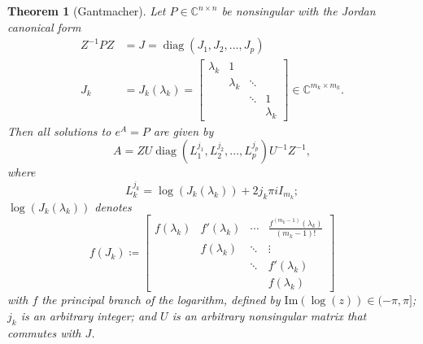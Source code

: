 \documentclass[letterpaper,10pt,journal,final]{IEEEtran}
\newtheorem{theorem}{Theorem}
\theoremstyle{definition}
\theoremstyle{remark}
\newcommand{\diag}{\operatorname{diag}}
\begin{document}
\begin{theorem}[Gantmacher{\protect\cite[Thm.~1.27]{Higham2008}}]
  \label{thm:matr-logar-Gantmacher}
  Let $P \in \mathbb{C}^{n \times n}$ be nonsingular with the Jordan canonical form
  \begin{subequations}
    \label{eq:jordan-form-matrix}
    \begin{alignat}{3}
      Z^{-1} P Z & = J = \diag(J_1, J_2, ..., J_p)\\
      J_k & = J_k(\lambda_k) =
      \begin{bmatrix}
        \lambda_k & 1 & & \\
        & \lambda_k & \ddots & \\
        & & \ddots & 1 \\
        & & & \lambda_k
      \end{bmatrix} \in \mathbb{C}^{m_k \times m_k}.
    \end{alignat}
  \end{subequations}
  Then all solutions to $e^{A} = P$ are given by
  \begin{equation}
    \label{eq:mat-log-all-sols-main}
    A = Z U \diag(L_1^{j_1}, L_2^{j_2}, ..., L_p^{j_p}) U^{-1} Z^{-1},
  \end{equation}
  where
  \begin{equation}
    \label{eq:mat-log-all-sols}
    L_k^{j_k} = \log(J_k(\lambda_k)) + 2 j_k \pi i I_{m_k};
  \end{equation}
  $\log(J_k(\lambda_k))$ denotes
  \begin{displaymath}
    f(J_k) \coloneqq
    \begin{bmatrix}
      f(\lambda_k) & f'(\lambda_k) & \cdots & \frac{f^{(m_k-1)}(\lambda_k)}{(m_k - 1)!} \\
      & f(\lambda_k) & \ddots & \vdots \\
      & & \ddots & f'(\lambda_k) \\
      & & & f(\lambda_k)
    \end{bmatrix}
  \end{displaymath}
  with $f$ the principal branch of the logarithm, defined by $\mathrm{Im}(\log(z)) \in (-\pi, \pi]$; $j_k$ is an arbitrary integer; and $U$ is an arbitrary nonsingular matrix that commutes with $J$.
\end{theorem}
\end{document}
